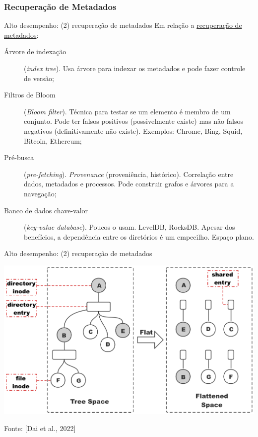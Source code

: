 \documentclass[xcolor=dvipsnames,table]{beamer}
\begin{document}
\subsubsection{Recuperação de Metadados}
\begin{frame}{Alto desempenho: (2) recuperação de metadados}
	Em relação a \underline{recuperação de metadados}:
	\begin{description}
		\item[Árvore de indexação] (\textit{index tree}). Usa árvore para indexar os metadados e pode fazer controle de versão;
		\item[Filtros de Bloom] (\textit{Bloom filter}). Técnica para testar se um elemento é membro de um conjunto. Pode ter falsos positivos (possivelmente existe) mas não falsos negativos (definitivamente não existe). Exemplos: Chrome, Bing, Squid, Bitcoin, Ethereum;
		\item[Pré-busca] (\textit{pre-fetching}). \textit{Provenance} (proveniência, histórico). Correlação entre dados, metadados e processos. Pode construir grafos e árvores para a navegação;
		\item[Banco de dados chave-valor] (\textit{key-value database}). Poucos o usam. LevelDB, RocksDB. Apesar dos benefícios, a dependência entre os diretórios é um empecilho. Espaço plano.
	\end{description}
\end{frame}

\begin{frame}{Alto desempenho: (2) recuperação de metadados}
	\begin{center}
		\includegraphics[scale=0.3]{flattened.png}
	\end{center}
	Fonte: [Dai et al., 2022]
\end{frame}
\end{document}
